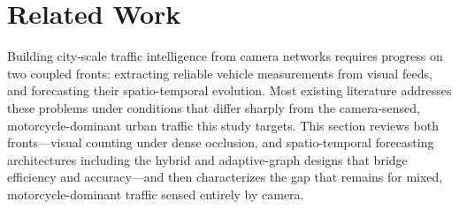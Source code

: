 \documentclass[preprint,12pt]{elsarticle}
\begin{document}
\section{Related Work}
\label{sec:related}

Building city-scale traffic intelligence from camera networks requires progress on two coupled fronts: extracting reliable vehicle measurements from visual feeds, and forecasting their spatio-temporal evolution. Most existing literature addresses these problems under conditions that differ sharply from the camera-sensed, motorcycle-dominant urban traffic this study targets. This section reviews both fronts---visual counting under dense occlusion, and spatio-temporal forecasting architectures including the hybrid and adaptive-graph designs that bridge efficiency and accuracy---and then characterizes the gap that remains for mixed, motorcycle-dominant traffic sensed entirely by camera.
\end{document}
